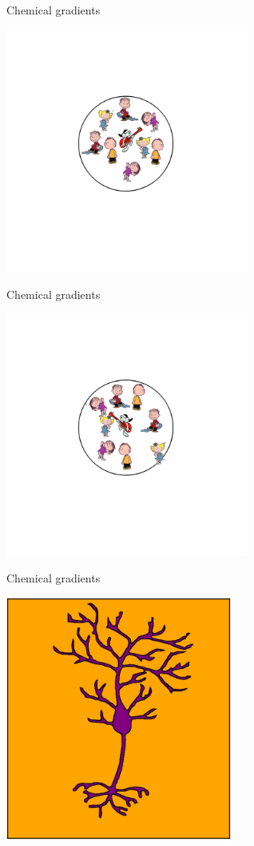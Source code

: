 \documentclass{beamer}
\begin{document}
\begin{frame}{Chemical gradients}
\begin{center}
    \includegraphics[height=8cm]{children3.png}
\end{center}
\end{frame}

\begin{frame}{Chemical gradients}
\begin{center}
    \includegraphics[height=8cm]{children4.png}
\end{center}
\end{frame}

\begin{frame}{Chemical gradients}
  \begin{center}
    \includegraphics[height=8cm]{neuron_ions.png}
  \end{center}
\end{frame}
\end{document}
